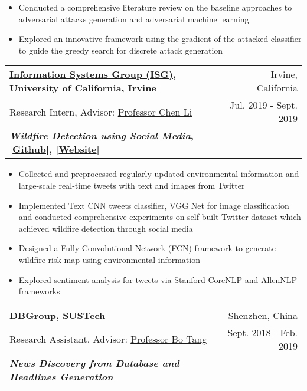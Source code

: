 \documentclass[letterpaper,11pt]{article}
\makeatletter
\newcommand{\resumeSubheading}[6]{
  \vspace{-1pt}\item
    \begin{tabular*}{0.97\textwidth}[t]{l@{\extracolsep{\fill}}r}
      \textbf{#1} & #2 \\
      #3 & #4 \\
      \textbf{#5} & \textbf{#6} \\
    \end{tabular*}\vspace{-5pt}
}
\makeatother
\begin{document}
{\begin{itemize}

          \item Conducted a comprehensive literature review on the baseline approaches to adversarial attacks generation and adversarial machine learning
          
          \item Explored an innovative framework using the gradient of the attacked classifier to guide the greedy search for discrete attack generation
          
        \end{itemize}
        
    \resumeSubheading
      {\href{https://isg.ics.uci.edu/}{Information Systems Group (ISG)}, University of California, Irvine}{Irvine, California}
      {Research Intern, Advisor: \href{https://chenli.ics.uci.edu/}{Professor Chen Li}}{Jul. 2019 - Sept. 2019}
      {\textit{Wildfire Detection using Social Media}, [\href{https://github.com/ISG-ICS/Wildfires}{Github}], [\href{http://wildfires.ics.uci.edu:2333/}{Website}]}{}
      
        \begin{itemize}
          \item Collected and preprocessed regularly updated environmental information and large-scale real-time tweets with text and images from Twitter
          
          \item Implemented Text CNN tweets classifier, VGG Net for image classification and conducted comprehensive experiments on self-built Twitter dataset which achieved wildfire detection through social media
          
          \item Designed a Fully Convolutional Network (FCN) framework to generate wildfire risk map using environmental information
          
          \item Explored sentiment analysis for tweets via Stanford CoreNLP and AllenNLP frameworks
        \end{itemize}
        
    \resumeSubheading
      {DBGroup, SUSTech}{Shenzhen, China}
      {Research Assistant, Advisor: \href{https://acm.sustech.edu.cn/btang/}{Professor Bo Tang}}{Sept. 2018 - Feb. 2019}
      {\textit{News Discovery from Database and Headlines Generation}}{}
      
}
\end{document}
